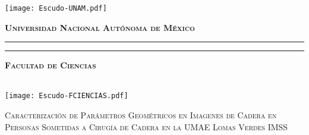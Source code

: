 \documentclass[letterpaper,12pt,oneside]{book}
\begin{document}
    \begin{titlepage}
        \thispagestyle{empty}
        \begin{minipage}[c][0.17\textheight][c]{0.25\textwidth}
            \begin{center}
                \texttt{[image: Escudo-UNAM.pdf]}
            \end{center}
        \end{minipage}
        \begin{minipage}[c][0.195\textheight][t]{0.75\textwidth}
            \begin{center}
                \vspace{0.3cm}
                \textbf{\textsc{\large Universidad Nacional Aut\'onoma de M\'exico}}\\[0.5cm]
                \vspace{0.3cm}
                \hrule height2.5pt
                \vspace{.2cm}
                \hrule height1pt
                \vspace{1.2cm}
                \textbf{\textsc{\large Facultad de Ciencias}}\\[0.5cm] %
            \end{center}
        \end{minipage}

        \begin{minipage}[c][0.81\textheight][t]{0.25\textwidth}
            \vspace*{5mm}
            \begin{center}
                \hskip2.0mm
                \vrule width1pt height13cm 
                \vspace{5mm}
                \hskip2pt
                \vrule width2.5pt height13cm
                \hskip2mm
                \vrule width1pt height13cm \\
                \vspace{5mm}
                \texttt{[image: Escudo-FCIENCIAS.pdf]}
            \end{center}
        \end{minipage}
        \begin{minipage}[c][0.81\textheight][t]{0.75\textwidth}
            \begin{center}
                \vspace{0.5cm}

                {\large\scshape Caracterización de Parámetros Geométricos en Imagenes de Cadera en Personas Sometidas a Cirugía de Cadera en la UMAE Lomas Verdes IMSS}


\end{center}
\end{minipage}
\end{titlepage}
\end{document}
